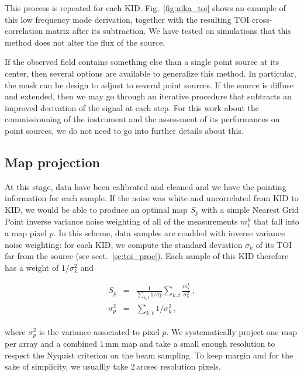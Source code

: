 This process is repeated for each KID. Fig.~\ref{fig:nika_toi} shows an example
of this low frequency mode derivation, together with the resulting TOI
cross-correlation matrix after its subtraction. We have tested on simulations
that this method does not alter the flux of the source.

If the observed field contains something else than a single point source at its
center, then several options are available to generalize this method. In
particular, the mask can be design to adjust to several point sources. If the
source is diffuse and extended, then we may go through an iterative procedure that
subtracts an improved derivation of the signal at each step. For this work about
the commissionning of the instrument and the assessment of its performances on
point sources, we do not need to go into further details about this.

\subsection{Map projection}
\label{se:map_projection}

At this stage, data have been calibrated and cleaned and we have the pointing
information for each sample. If the noise was white and uncorrelated from KID to
KID, we would be able to produce an optimal map $S_p$ with a simple Nearest Grid
Point inverse variance noise weighting of all of the measurements $m^k_t$ that
fall into a map pixel $p$. In this scheme, data samples are coadded with inverse
variance noise weighting: for each KID, we compute the standard deviation
$\sigma_k$ of its TOI far from the source (see sect.~\ref{se:toi_proc}). Each
sample of this KID therefore has a weight of $1/\sigma_k^2$ and

\begin{eqnarray}
S_p        &=& \frac{1}{\sum_{k,t}1/\sigma_k^2}\sum_{k,t} \frac{m^k_t}{\sigma_k^2}\,, \label{eq:ngp_sum}\\
\sigma^2_p &=& \sum_{k,t}1/\sigma_k^2\,, \label{eq:ngp_var}
\end{eqnarray}

where $\sigma^2_p$ is the variance associated to pixel $p$. We systematically
project one map per array and a combined 1\,mm map and take a small enough
resolution to respect the Nyquist criterion on the beam sampling. To keep margin
and for the sake of simplicity, we usuallly take 2\,arcsec resolution pixels.

